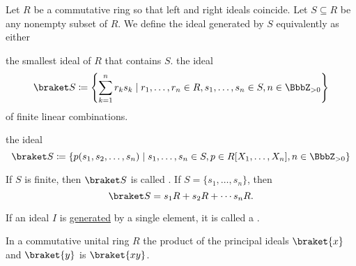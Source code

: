 \begin{definition}\label{def:generated_ring_ideal}
  Let \( R \) be a commutative ring so that left and right ideals coincide. Let \( S \subseteq R \) be any nonempty subset of \( R \). We define the ideal generated by \( S \) equivalently as either
  \begin{thmenum}
     the smallest ideal of \( R \) that contains \( S \).
     the ideal
    \begin{equation*}
      \braket S \coloneqq \left\{ \sum_{k=1}^n r_k s_k \mid r_1, \ldots, r_n \in R, s_1, \ldots, s_n \in S, n \in \BbbZ_{>0} \right\}
    \end{equation*}
    of finite linear combinations.

     the ideal
    \begin{equation*}
      \braket S \coloneqq \left\{ p(s_1, s_2, \ldots, s_n) \mid s_1, \ldots, s_n \in S, p \in R[X_1, \ldots, X_n], n \in \BbbZ_{>0} \right\}
    \end{equation*}
  \end{thmenum}

  If \( S \) is finite, then \( \braket S \) is called . If \( S = \{ s_1, \ldots, s_n \} \), then
  \begin{equation*}
    \braket S = s_1 R + s_2 R + \cdots s_n R.
  \end{equation*}
\end{definition}

\begin{definition}\label{def:principal_ideal}
  If an ideal \( I \) is \hyperref[def:generated_ring_ideal]{generated} by a single element, it is called a .
\end{definition}

\begin{proposition}\label{thm:product_of_principal_ideals}
  In a commutative unital ring \( R \) the product of the principal ideals \( \braket{x} \) and \( \braket{y} \) is \( \braket{xy} \).
\end{proposition}
